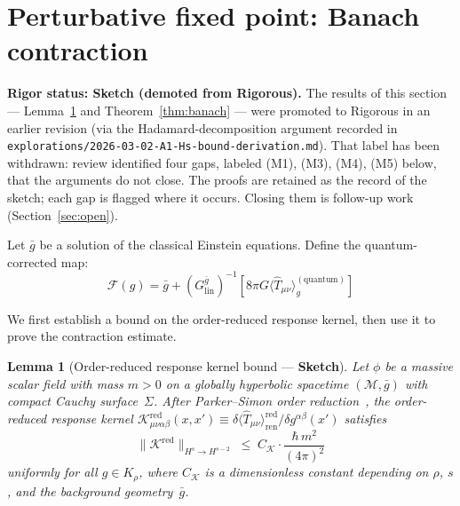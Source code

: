\documentclass[12pt,a4paper]{article}
\newtheorem{lemma}{Lemma}
\begin{document}
\section{Perturbative fixed point: Banach contraction}
\label{sec:banach}

\noindent\textbf{Rigor status: Sketch (demoted from Rigorous).} The results of this
section --- Lemma~\ref{lem:kernel_bound} and Theorem~\ref{thm:banach} --- were promoted
to Rigorous in an earlier revision (via the Hadamard-decomposition argument recorded in
\texttt{explorations/2026-03-02-A1-Hs-bound-derivation.md}). That label has been
withdrawn: review identified four gaps, labeled (M1), (M3), (M4), (M5) below, that the
arguments do not close. The proofs are retained as the record of the sketch; each gap is
flagged where it occurs. Closing them is follow-up work (Section~\ref{sec:open}).

\medskip

Let $\bar{g}$ be a solution of the classical Einstein equations. Define the
quantum-corrected map:
\begin{equation}
\mathcal{F}(g) = \bar{g} + (G^{\bar{g}}_{\text{lin}})^{-1}\!\left[8\pi G\langle\hat{T}_{\mu\nu}\rangle^{(\text{quantum})}_g\right]
\end{equation}

\noindent We first establish a bound on the order-reduced response kernel, then use it
to prove the contraction estimate.

\begin{lemma}[Order-reduced response kernel bound --- \textbf{Sketch}]
\label{lem:kernel_bound}
Let $\phi$ be a massive scalar field with mass $m > 0$ on a globally hyperbolic spacetime
$(\mathcal{M},\bar{g})$ with compact Cauchy surface~$\Sigma$. After Parker--Simon order
reduction~\emph{\cite{parker_simon}}, the order-reduced response kernel
$\mathcal{K}^{\mathrm{red}}_{\mu\nu\alpha\beta}(x,x')
\equiv \delta\langle\hat{T}_{\mu\nu}\rangle^{\mathrm{red}}_{\mathrm{ren}}/\delta g^{\alpha\beta}(x')$
satisfies
\begin{equation}
\bigl\|\mathcal{K}^{\mathrm{red}}\bigr\|_{H^s \to H^{s-2}}
\;\leq\; C_{\mathcal{K}} \cdot \frac{\hbar\, m^2}{(4\pi)^2}
\label{eq:kernel_bound}
\end{equation}
uniformly for all $g \in K_\rho$, where $C_{\mathcal{K}}$ is a dimensionless constant
depending on $\rho$, $s$, and the background geometry~$\bar{g}$.
\end{lemma}
\end{document}
